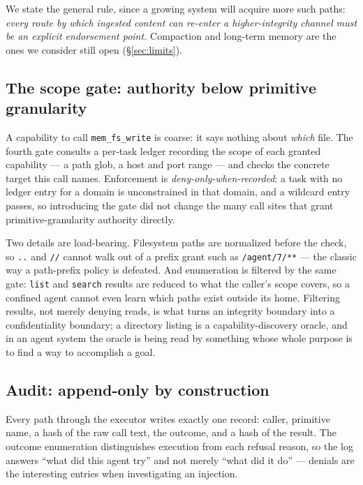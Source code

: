 \documentclass[11pt]{article}
\newcommand{\code}[1]{\texttt{#1}}
\begin{document}
We state the general rule, since a growing system will acquire more such
paths: \emph{every route by which ingested content can re-enter a
higher-integrity channel must be an explicit endorsement point.} Compaction
and long-term memory are the ones we consider still open
(\S\ref{sec:limits}).

\subsection{The scope gate: authority below primitive granularity}
\label{sec:scope}

A capability to call \code{mem\_fs\_write} is coarse: it says nothing about
\emph{which} file. The fourth gate consults a per-task ledger recording the
scope of each granted capability --- a path glob, a host and port range --- and
checks the concrete target this call names. Enforcement is
\emph{deny-only-when-recorded}: a task with no ledger entry for a domain is
unconstrained in that domain, and a wildcard entry passes, so introducing the
gate did not change the many call sites that grant primitive-granularity
authority directly.

Two details are load-bearing. Filesystem paths are normalized before the check,
so \code{..} and \code{//} cannot walk out of a prefix grant such as
\code{/agent/7/**} --- the classic way a path-prefix policy is defeated. And
enumeration is filtered by the same gate: \code{list} and \code{search}
results are reduced to what the caller's scope covers, so a confined agent
cannot even learn which paths exist outside its home. Filtering results, not
merely denying reads, is what turns an integrity boundary into a
confidentiality boundary; a directory listing is a capability-discovery oracle,
and in an agent system the oracle is being read by something whose whole
purpose is to find a way to accomplish a goal.

\subsection{Audit: append-only by construction}
\label{sec:audit}

Every path through the executor writes exactly one record: caller, primitive
name, a hash of the raw call text, the outcome, and a hash of the result. The
outcome enumeration distinguishes execution from each refusal reason, so the
log answers ``what did this agent try'' and not merely ``what did it do'' ---
denials are the interesting entries when investigating an injection.
\end{document}
